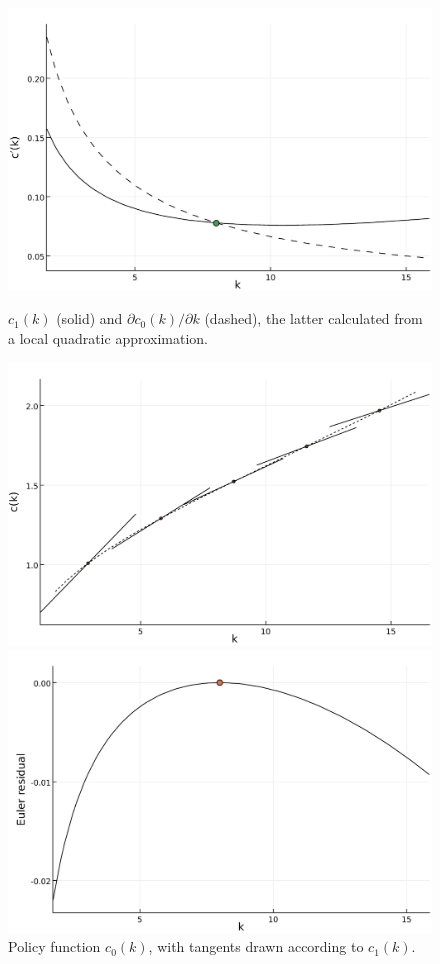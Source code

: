 \documentclass[a4paper,11pt]{article}
\newcommand{\figwidth}{\linewidth}
\begin{document}
\begin{figure}[b]
\begin{minipage}[t]{0.48\linewidth}
    \includegraphics[width=\figwidth]{../fig/cderiv-consistent-local.pdf}
    \caption{$c_1(k)$ (solid) and $\partial c_0(k)/ \partial k$ (dashed), the latter calculated from a local quadratic approximation.}
    \label{fig:cderiv-consistentlocal}
  \end{minipage}\hfill%
  \begin{minipage}[t]{0.48\linewidth}
    \includegraphics[width=\figwidth]{../fig/ck-tangents-consistent-local.pdf}
    \caption{Policy function $c_0(k)$, with tangents drawn according to $c_1(k)$.}
    \label{fig:policy-tangents}
  \end{minipage}
  \begin{minipage}[t]{0.48\linewidth}
    \includegraphics[width=\figwidth]{../fig/eulerresid-consistent-local.pdf}

\end{minipage}
\end{figure}
\end{document}
